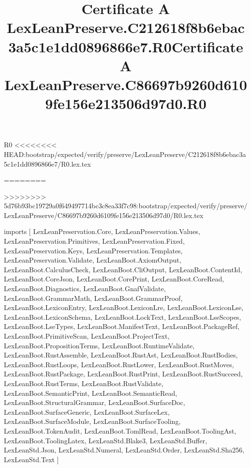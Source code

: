 \begin{lexlean}{R0}
<<<<<<<< HEAD:bootstrap/expected/verify/preserve/LexLeanPreserve/C212618f8b6ebac3a5c1e1dd0896866e7/R0.lex.tex
\title{Certificate A LexLeanPreserve.C212618f8b6ebac3a5c1e1dd0896866e7.R0}
========
\title{Certificate A LexLeanPreserve.C86697b9260d6109fe156e213506d97d0.R0}
>>>>>>>> 5d76b93bc19729a0f649497714bc3c8ea33f7c98:bootstrap/expected/verify/preserve/LexLeanPreserve/C86697b9260d6109fe156e213506d97d0/R0.lex.tex
\begin{coremodule}
imports [
  LexLeanPreservation.Core,
  LexLeanPreservation.Values,
  LexLeanPreservation.Primitives,
  LexLeanPreservation.Fixed,
  LexLeanPreservation.Keys,
  LexLeanPreservation.Templates,
  LexLeanPreservation.Validate,
  LexLeanBoot.AxiomOutput,
  LexLeanBoot.CalculusCheck,
  LexLeanBoot.CliOutput,
  LexLeanBoot.ContentId,
  LexLeanBoot.CoreJson,
  LexLeanBoot.CorePrint,
  LexLeanBoot.CoreRead,
  LexLeanBoot.Diagnostics,
  LexLeanBoot.GnafValidate,
  LexLeanBoot.GrammarMath,
  LexLeanBoot.GrammarProof,
  LexLeanBoot.LexiconEntry,
  LexLeanBoot.LexiconLre,
  LexLeanBoot.LexiconLse,
  LexLeanBoot.LexiconSchema,
  LexLeanBoot.LockText,
  LexLeanBoot.LseScopes,
  LexLeanBoot.LseTypes,
  LexLeanBoot.ManifestText,
  LexLeanBoot.PackageRef,
  LexLeanBoot.PrimitiveScan,
  LexLeanBoot.ProjectText,
  LexLeanBoot.PropositionTerms,
  LexLeanBoot.RuntimeValidate,
  LexLeanBoot.RustAssemble,
  LexLeanBoot.RustAst,
  LexLeanBoot.RustBodies,
  LexLeanBoot.RustLoops,
  LexLeanBoot.RustLower,
  LexLeanBoot.RustMoves,
  LexLeanBoot.RustPackage,
  LexLeanBoot.RustPrint,
  LexLeanBoot.RustSucceed,
  LexLeanBoot.RustTerms,
  LexLeanBoot.RustValidate,
  LexLeanBoot.SemanticPrint,
  LexLeanBoot.SemanticRead,
  LexLeanBoot.StructuralGrammar,
  LexLeanBoot.SurfaceDoc,
  LexLeanBoot.SurfaceGeneric,
  LexLeanBoot.SurfaceLex,
  LexLeanBoot.SurfaceModule,
  LexLeanBoot.SurfaceTooling,
  LexLeanBoot.TokenAudit,
  LexLeanBoot.TomlRead,
  LexLeanBoot.ToolingAst,
  LexLeanBoot.ToolingLatex,
  LexLeanStd.Blake3,
  LexLeanStd.Buffer,
  LexLeanStd.Json,
  LexLeanStd.Numeral,
  LexLeanStd.Order,
  LexLeanStd.Sha256,
  LexLeanStd.Text
]


\end{coremodule}
\end{lexlean}
